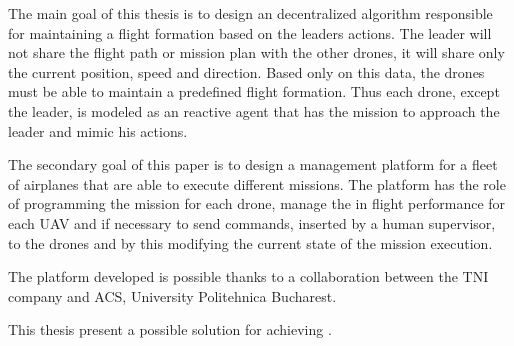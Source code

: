 The main goal of this thesis is to design an decentralized algorithm responsible
for maintaining a flight formation based on the leaders actions. The leader will
not share the flight path or mission plan with the other drones, it will share
only the current position, speed and direction. Based only on this data, the 
drones must be able to maintain a predefined flight formation. Thus each drone, 
except the leader, is modeled as an reactive agent that has the mission to 
approach the leader and mimic his actions.

The secondary goal of this paper is to design a management platform for a 
fleet of airplanes that are able to execute different missions. The platform has
the role of programming the mission for each drone,  manage the in flight
performance for each UAV and if necessary to send commands, inserted by a human
supervisor, to the drones and by this modifying the current state of the mission
execution.

The platform developed is possible thanks to a collaboration between the 
TNI company and ACS, University Politehnica Bucharest.

This thesis present a possible solution for achieving \project.

